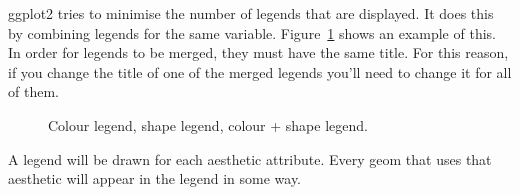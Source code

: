 ggplot2 tries to minimise the number of legends that are displayed.  It does this by combining legends for the same variable.  Figure~\ref{fig:legend-merge} shows an example of this.  In order for legends to be merged, they must have the same title.  For this reason, if you change the title of one of the merged legends you'll need to change it for all of them.

\begin{figure}[htbp]
  \centering
  \caption{Colour legend, shape legend, colour + shape legend.}
  \label{fig:legend-merge}
\end{figure}

A legend will be drawn for each aesthetic attribute.  Every geom that uses that aesthetic will appear in the legend in some way.

